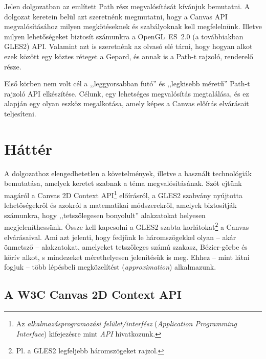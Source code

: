 \documentclass[12pt]{report}
\theoremstyle{definition}
\newcommand{\inenglish}[1]{\textsl{#1}}
\begin{document}
Jelen dolgozatban az említett Path rész megvalósítását kívánjuk bemutatni. A
dolgozat keretein belül azt szeretnénk megmutatni, hogy a Canvas API
megvalósításához milyen megkötéseknek és szabályoknak kell megfelelnünk.
Illetve milyen lehetőségeket biztosít számunkra a OpenGL~ES~2.0 (a továbbiakban
GLES2) API. Valamint azt is szeretnénk az olvasó elé tárni, hogy hogyan alkot
ezek között egy köztes réteget a Gepard, és annak is a Path-t rajzoló,
renderelő része.

Első körben nem volt cél a ,,leggyorsabban futó'' és ,,legkisebb méretű''
Path-t rajzoló API elkészítése. Célunk, egy lehetséges megvalósítás
megtalálása, és ez alapján egy olyan eszköz megalkotása, amely képes a Canvas
előírás elvárásait teljesíteni.



    \chapter{Háttér}
    \label{sec:Háttér}

A dolgozathoz elengedhetetlen a követelmények, illetve a használt technológiák
bemutatása, amelyek keretet szabnak a téma megvalósításának. Szót ejtünk
magáról a Canvas 2D Context API\footnote{Az \emph{alkalmazásprogramozási
felület/interfész} (\inenglish{Application Programming Interface}) kifejezésre
mint \emph{API} hivatkozunk.} előírásról, a GLES2 szabvány nyújtotta
lehetőségekről és azokról a matematikai módszerekről, amelyek biztosítják
számunkra, hogy ,,tetszőlegesen bonyolult'' alakzatokat helyesen
megjeleníthessünk. Össze kell kapcsolni a GLES2 szabta korlátokat\footnote {Pl.
a GLES2 legfeljebb háromszögeket rajzol.} a Canvas elvárásaival. Ami azt
jelenti, hogy fedjünk le háromszögekkel olyan -- akár önmetsző -- alakzatokat,
amelyeket tetszőleges számú szakasz, Bézier-görbe és körív alkot, s
mindezeket mérethelyesen jelenítésük is meg. Ehhez -- mint látni fogjuk -- több
lépésbeli megközelítést (\inenglish{approximation}) alkalmazunk.

    \section[A Canvas 2D Context API]{A W3C Canvas 2D Context API}
    \label{sec:A_Canvas_előírás}
\end{document}
